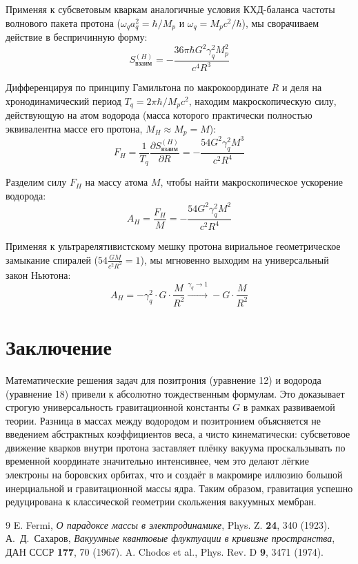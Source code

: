 \documentclass[twocolumn,PRD,amsmath,amssymb,superscriptaddress]{revtex4-1}
\begin{document}
Применяя к субсветовым кваркам аналогичные условия КХД-баланса частоты волнового пакета протона ($\omega_q a_q^2 = \hbar/M_p$ и $\omega_q = M_p c^2/\hbar$), мы сворачиваем действие в беспричинную форму:
\begin{equation}
S_{взаим}^{(H)} = - \frac{36\pi \hbar G^2 \gamma_q^2 M_p^2}{c^4 R^3}
\end{equation}

Дифференцируя по принципу Гамильтона по макрокоординате $R$ и деля на хронодинамический период $T_q = 2\pi\hbar / M_p c^2$, находим макроскопическую силу, действующую на атом водорода (масса которого практически полностью эквивалентна массе его протона, $M_H \approx M_p = M$):
\begin{equation}
F_H = \frac{1}{T_q} \frac{\partial S_{взаим}^{(H)}}{\partial R} = - \frac{54 G^2 \gamma_q^2 M^3}{c^2 R^4}
\end{equation}

Разделим силу $F_H$ на массу атома $M$, чтобы найти макроскопическое ускорение водорода:
\begin{equation}
A_H = \frac{F_H}{M} = - \frac{54 G^2 \gamma_q^2 M^2}{c^2 R^4}
\end{equation}


Применяя к ультрарелятивистскому мешку протона вириальное геометрическое замыкание спиралей ($54 \frac{G M}{c^2 R^2} = 1$), мы мгновенно выходим на универсальный закон Ньютона:
\begin{equation}
A_H = - \gamma_q^2 \cdot G \cdot \frac{M}{R^2} \xrightarrow{\gamma_q \rightarrow 1} - G \cdot \frac{M}{R^2}
\end{equation}
\section{Заключение}
Математические решения задач для позитрония (уравнение 12) и водорода (уравнение 18) привели к абсолютно тождественным формулам. Это доказывает строгую универсальность гравитационной константы $G$ в рамках развиваемой теории.
Разница в массах между водородом и позитронием объясняется не введением абстрактных коэффициентов веса, а чисто кинематически: субсветовое движение кварков внутри протона заставляет плёнку вакуума проскальзывать по временной координате значительно интенсивнее, чем это делают лёгкие электроны на боровских орбитах, что и создаёт в макромире иллюзию большой инерциальной и гравитационной массы ядра. Таким образом, гравитация успешно редуцирована к классической геометрии скольжения вакуумных мембран.
\begin{thebibliography}{9}
 E. Fermi, {\it О парадоксе массы в электродинамике}, Phys. Z. {\bf 24}, 340 (1923).
 А.~Д.~Сахаров, {\it Вакуумные квантовые флуктуации в кривизне пространства}, ДАН СССР {\bf 177}, 70 (1967).
 A. Chodos et al., Phys. Rev. D {\bf 9}, 3471 (1974).
\end{thebibliography}
\end{document}
